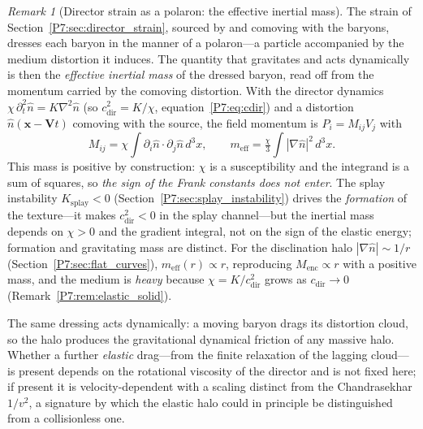 \documentclass[11pt,a4paper]{article}
\theoremstyle{definition}
\theoremstyle{remark}
\newtheorem{remark}[theorem]{Remark}
\begin{document}
\begin{remark}[Director strain as a polaron: the effective inertial mass]
\label{P7:rem:polaron}
The strain of Section~\ref{P7:sec:director_strain}, sourced by and
comoving with the baryons, dresses each baryon in the manner of a
polaron---a particle accompanied by the medium distortion it induces.
The quantity that gravitates and acts dynamically is then the
\emph{effective inertial mass} of the dressed baryon, read off from the
momentum carried by the comoving distortion.  With the director dynamics
$\chi\,\partial_t^2\hat{n}=K\nabla^2\hat{n}$ (so
$c_{\mathrm{dir}}^2=K/\chi$, equation~\eqref{P7:eq:cdir}) and a distortion
$\hat{n}(\mathbf{x}-\mathbf{V}t)$ comoving with the source, the field
momentum is $P_i=M_{ij}V_j$ with
\begin{equation}
  M_{ij}=\chi\!\int\!\partial_i\hat{n}\cdot\partial_j\hat{n}\,d^3x,
  \qquad
  m_{\mathrm{eff}}=\tfrac{\chi}{3}\!\int\!|\nabla\hat{n}|^2\,d^3x .
  \label{P7:eq:meff}
\end{equation}
This mass is positive by construction: $\chi$ is a susceptibility and the
integrand is a sum of squares, so \emph{the sign of the Frank constants
does not enter}.  The splay instability $K_{\mathrm{splay}}<0$
(Section~\ref{P7:sec:splay_instability}) drives the \emph{formation} of
the texture---it makes $c_{\mathrm{dir}}^2<0$ in the splay channel---but
the inertial mass depends on $\chi>0$ and the gradient integral, not on
the sign of the elastic energy; formation and gravitating mass are
distinct.  For the disclination halo $|\nabla\hat{n}|\sim1/r$
(Section~\ref{P7:sec:flat_curves}), $m_{\mathrm{eff}}(r)\propto r$,
reproducing $M_{\mathrm{enc}}\propto r$ with a positive mass, and the
medium is \emph{heavy} because $\chi=K/c_{\mathrm{dir}}^2$ grows as
$c_{\mathrm{dir}}\to0$ (Remark~\ref{P7:rem:elastic_solid}).

The same dressing acts dynamically: a moving baryon drags its distortion
cloud, so the halo produces the gravitational dynamical friction of any
massive halo.  Whether a further \emph{elastic} drag---from the finite
relaxation of the lagging cloud---is present depends on the rotational
viscosity of the director and is not fixed here; if present it is
velocity-dependent with a scaling distinct from the Chandrasekhar
$1/v^2$, a signature by which the elastic halo could in principle be
distinguished from a collisionless one.
\end{remark}
\end{document}
